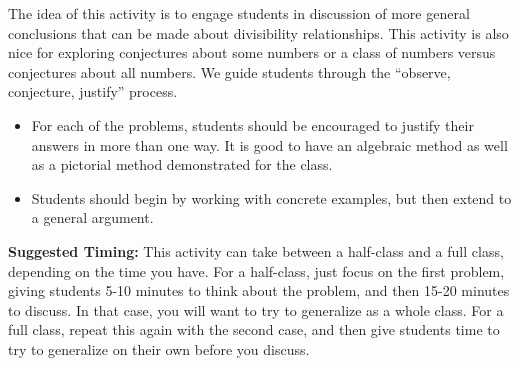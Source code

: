 \documentclass{ximera}
\begin{document}
\newpage
\begin{instructorNotes}
The idea of this activity is to engage students in discussion of more general conclusions that can be made about divisibility relationships.  This activity is also nice for exploring conjectures about some numbers or a class of numbers versus conjectures about all numbers.  We guide students through the ``observe, conjecture, justify'' process.

\begin{itemize}
    \item For each of the problems, students should be encouraged to justify their answers in more than one way.  It is good to have an algebraic method as well as a pictorial method demonstrated for the class.
    \item Students should begin by working with concrete examples, but then extend to a general argument.
\end{itemize}

{\bf Suggested Timing:} This activity can take between a half-class and a full class, depending on the time you have.  For a half-class, just focus on the first problem, giving students 5-10 minutes to think about the problem, and then 15-20 minutes to discuss.  In that case, you will want to try to generalize as a whole class.  For a full class, repeat this again with the second case, and then give students time to try to generalize on their own before you discuss.

\end{instructorNotes}

 
\end{document}
